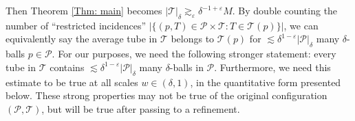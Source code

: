 \documentclass{amsart}
\newtheorem{cor}[prop]{Corollary}
\newcommand{\T}{\mathcal{T}}
\newcommand{\eps}{\varepsilon}
\newcommand{\lesim}{\lesssim}
\newcommand{\gesim}{\gtrsim}
\newcommand{\cT}{\mathcal{T}}
\newcommand{\cP}{\mathcal{P}}
\begin{document}




Then Theorem \ref{Thm: main} becomes $|\T|_\delta \gesim_\eps \delta^{-1+\eps} M$. By double counting the number of ``restricted incidences'' $|\{ (p, T) \in \cP \times \cT : T \in \T(p) \}|$, we can equivalently say the average tube in $\T$ belongs to $\T(p)$ for $\lesim \delta^{1-\eps} |\cP|_\delta$ many $\delta$-balls $p \in \cP$. For our purposes, we need the following stronger statement: every tube in $\T$ contains $\lesim \delta^{1-\eps} |\cP|_\delta$ many $\delta$-balls in $\cP$. Furthermore, we need this estimate to be true at all scales $w \in (\delta, 1)$, in the quantitative form presented below. These strong properties may not be true of the original configuration $(\cP, \cT)$, but will be true after passing to a refinement.
\end{document}
